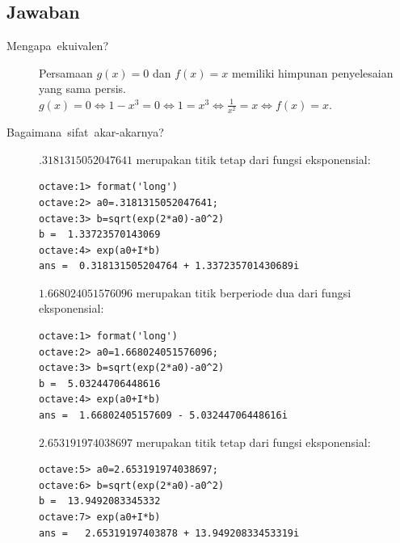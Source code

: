 \subsection*{Jawaban}
\begin{description}
\item [{Mengapa~ekuivalen?}] \label{que:whyEquivalent}Persamaan $g(x)=0$
dan $f(x)=x$ memiliki himpunan penyelesaian yang sama persis. $g(x)=0\Leftrightarrow1-x^{3}=0\Leftrightarrow1=x^{3}\Leftrightarrow\frac{1}{x^{2}}=x\Leftrightarrow f(x)=x$.
\item [{Bagaimana~sifat~akar-akarnya?}] \label{que:natureOfRoots} $.3181315052047641$
merupakan titik tetap dari fungsi eksponensial: \begin{verbatim}
octave:1> format('long')
octave:2> a0=.3181315052047641;
octave:3> b=sqrt(exp(2*a0)-a0^2)
b =  1.33723570143069
octave:4> exp(a0+I*b)
ans =  0.318131505204764 + 1.337235701430689i
\end{verbatim} $1.668024051576096$ merupakan titik berperiode dua dari fungsi eksponensial:
\begin{verbatim}
octave:1> format('long')
octave:2> a0=1.668024051576096;
octave:3> b=sqrt(exp(2*a0)-a0^2)
b =  5.03244706448616
octave:4> exp(a0+I*b)
ans =  1.66802405157609 - 5.03244706448616i
\end{verbatim} $2.653191974038697$ merupakan titik tetap dari fungsi eksponensial:
\begin{verbatim}
octave:5> a0=2.653191974038697;
octave:6> b=sqrt(exp(2*a0)-a0^2)
b =  13.9492083345332
octave:7> exp(a0+I*b)
ans =   2.65319197403878 + 13.94920833453319i 
\end{verbatim}
\end{description}

